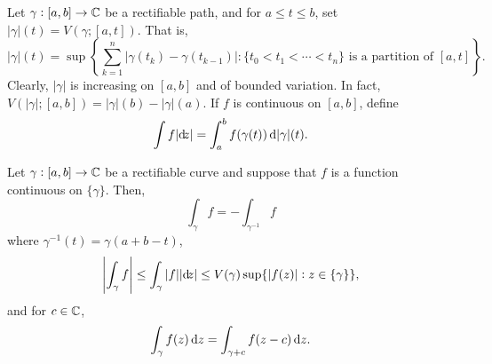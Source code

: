 	\begin{definition}
		Let $\gamma : [a,b] \to \mathbb{C}$ be a rectifiable path, and for $a \le t \le b$, set $|\gamma|(t) = V(\gamma;[a,t])$. That is,
		\[ |\gamma|(t) = \sup\left\{ \sum_{k=1}^{n} |\gamma(t_k) - \gamma(t_{k-1})| : \{ t_0 < t_1 < \cdots < t_n \}\text{ is a partition of }[a,t] \right\}. \]
		Clearly, $|\gamma|$ is increasing on $[a,b]$ and of bounded variation. In fact, $V(|\gamma|;[a,b]) = |\gamma|(b) - |\gamma|(a)$. If $f$ is continuous on $[a,b]$, define
		\[ \int f |{\dif} {z}| = \int_a^b f(\gamma(t)) \dif |\gamma|(t). \]
	\end{definition}

	\begin{ftheo}
		Let $\gamma : [a,b] \to \mathbb{C}$ be a rectifiable curve and suppose that $f$ is a function continuous on $\{\gamma\}$. Then,
		\begin{equation}
			\label{eqn: 2.2}
			\int_\gamma f = - \int_{\gamma^{-1}} f
		\end{equation}
		where $\gamma^{-1}(t) = \gamma(a+b-t)$,
		\begin{equation}
			\label{eqn: 2.3}
			\left| \int_\gamma f \right| \le \int_\gamma |f| |{\dif} {z}| \le V(\gamma) \sup\{ |f(z)| : z \in \{\gamma\} \},
		\end{equation}
		and for $c \in \mathbb{C}$,
		\begin{equation}
			\label{eqn: 2.4}
			\int_\gamma f(z) \dif z = \int_{\gamma + c} f(z-c) \dif z.
		\end{equation}
	\end{ftheo}
